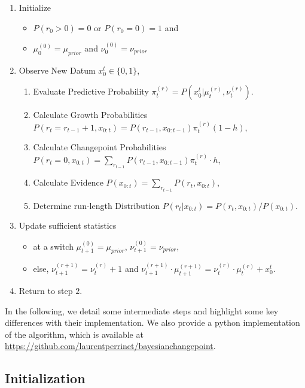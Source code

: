 \documentclass[10pt,letterpaper]{article}
\newcommand{\eqa}[1]{\begin{align}#1\end{align}}
\begin{document}
\begin{enumerate}
	\item Initialize
	\begin{itemize}
		\item    $P(r_0>0)= 0$ or $P(r_0=0)=1$ and
		\item    $\mu^{(0)}_0 = \mu_{prior}$ and $\nu^{(0)}_0 = \nu_{prior}$
	\end{itemize}

	\item     Observe New Datum $x_0^t \in \{ 0, 1 \}$,

	\begin{enumerate}

		\item    Evaluate Predictive Probability $\pi^{(r)}_{t} = P(x_0^t |\mu^{(r)}_t,\nu^{(r)}_t)$.
	    \item    Calculate Growth Probabilities $P(r_t=r_{t-1}+1, x_{0:t}) = P(r_{t-1}, x_{0:t-1}) \pi^{(r)}_t (1-h)$,
	    \item    Calculate Changepoint Probabilities $P(r_t=0, x_{0:t})= \sum_{r_{t-1}} P(r_{t-1}, x_{0:t-1}) \pi^{(r)}_t \cdot h$,
	    \item    Calculate Evidence $P(x_{0:t}) = \sum_{r_{t-1}} P (r_t, x_{0:t})$,
	    \item    Determine run-length Distribution $P (r_t | x_{0:t}) = P (r_t, x_{0:t})/P (x_{0:t}) $.
	\end{enumerate}

	\item     Update sufficient statistics
		\begin{itemize}
			\item  at a switch  $\mu^{(0)}_{t+1} = \mu_{prior}$, $\nu^{(0)}_{t+1} = \nu_{prior}$,
			\item  else, $\nu^{(r+1)}_{t+1} = \nu^{(r)}_{t} + 1$ and $\nu^{(r+1)}_{t+1} \cdot \mu^{(r+1)}_{t+1} = \nu^{(r)}_{t} \cdot \mu^{(r)}_{t} + x_0^t$.
		\end{itemize}
	\item     Return to step $2$.
\end{enumerate}


In the following, we  detail some intermediate steps and highlight some key differences with their implementation. We also provide a python implementation of the algorithm, which is available at \url{https://github.com/laurentperrinet/bayesianchangepoint}.

\subsection{Initialization}
\end{document}
